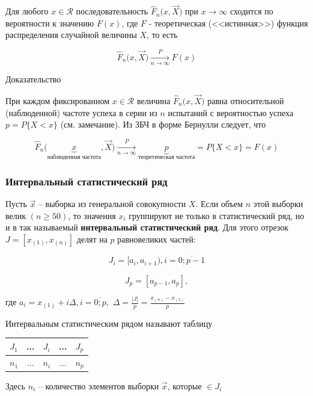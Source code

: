 \begin{theorem}
    Для любого $x \in \mathcal R$ последовательность
    $\hat F_n \big( x, \vec X \big)$ при $x \to \infty$ сходится
    по вероятности к значению $F(x)$, где $F$ - теоретическая
    (<<истинная>>) функция распределения случайной величины $X$, то
    есть

    \begin{equation*}
        \hat F_n \big(x, \vec X\big)  \xrightarrow[n \to \infty]{P} F(x)
    \end{equation*}
\end{theorem}

Доказательство

При каждом фиксированном $x \in \mathcal R$ величина
$\hat F_n \big( x, \vec X \big)$ равна относительной (наблюденной)
частоте успеха в серии из $n$ испытаний с вероятностью успеха
$p = P\{X < x\}$ (см. замечание). Из ЗБЧ в форме Бернулли следует,
что

\begin{equation*}
    \hat F_n \big( \underbrace{x}_\text{наблюденная частота},
    \vec X \big) \xrightarrow[n \to \infty]{P}
    \underbrace{p}_\text{теоретическая частота} = P\{X<x\} = F(x)
\end{equation*}

\subsubsection{Интервальный статистический ряд}

Пусть $\vec x$ -- выборка из генеральной совокупности $X$. Если
объем $n$ этой выборки велик $(n \geq 50)$, то значения $x_i$
группируют не только в статистический ряд, но и в так называемый
\textbf{интервальный статистический ряд}. Для этого отрезок
$J = [x_{(1)}, x_{(n)}]$ делят на $p$ равновеликих частей:

\begin{equation*}
    J_i = [a_i, a_{i+1}), i = \overline{0; p - 1}
\end{equation*}

\begin{equation*}
    J_p = [a_{p-1}, a_p],
\end{equation*}

где $a_i = x_{(1)} + i\Delta, i = \overline{0;p},$
$\Delta = \frac{|J|}{p} = \frac{x_{(n)} - x_{(1)}}{p}$

\begin{defenition}
    Интервальным статистическим рядом называют таблицу

    \begin{table}[H]
        \centering
        \begin{tabular}{|c|c|c|c|c|}
            \hline
            $J_1$ & ... &$J_i$ & ... & $J_p$ \\
            \hline
            $n_1$ & ... & $n_i$ & ... & $n_p$ \\
            \hline
        \end{tabular}
    \end{table}

    Здесь $n_i$ -- количество элементов выборки $\vec x$, которые
    $\in J_i$
\end{defenition}

